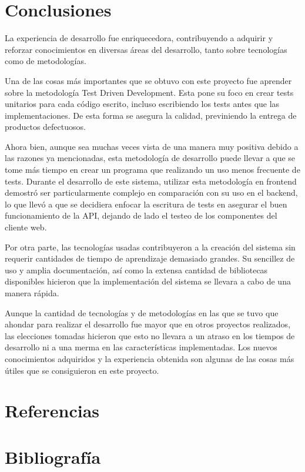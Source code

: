 \documentclass[twoside]{article}
\begin{document}
\section{Conclusiones}
La experiencia de desarrollo fue enriquecedora, contribuyendo a adquirir y reforzar conocimientos en diversas áreas del desarrollo, tanto sobre tecnologías como de metodologías.

Una de las cosas más importantes que se obtuvo con este proyecto fue aprender sobre la metodología Test Driven Development. Esta pone su foco en crear tests unitarios para cada código escrito, incluso escribiendo los tests antes que las implementaciones. De esta forma se asegura la calidad, previniendo la entrega de productos defectuosos.

Ahora bien, aunque sea muchas veces vista de una manera muy positiva debido a las razones ya mencionadas, esta metodología de desarrollo puede llevar a que se tome más tiempo en crear un programa que realizando un uso menos frecuente de tests. Durante el desarrollo de este sistema, utilizar esta metodología en frontend demostró ser particularmente complejo en comparación con su uso en el backend, lo que llevó a que se decidiera enfocar la escritura de tests en asegurar el buen funcionamiento de la API, dejando de lado el testeo de los componentes del cliente web.

Por otra parte, las tecnologías usadas contribuyeron a la creación del sistema sin requerir cantidades de tiempo de aprendizaje demasiado grandes. Su sencillez de uso y amplia documentación, así como la extensa cantidad de bibliotecas disponibles hicieron que la implementación del sistema se llevara a cabo de una manera rápida.

Aunque la cantidad de tecnologías y de metodologías en las que se tuvo que ahondar para realizar el desarrollo fue mayor que en otros proyectos realizados, las elecciones tomadas hicieron que esto no llevara a un atraso en los tiempos de desarrollo ni a una merma en las características implementadas. Los nuevos conocimientos adquiridos y la experiencia obtenida son algunas de las cosas más útiles que se consiguieron en este proyecto.
\newpage
\section{Referencias}
\begin{sloppypar}
\printbibliography[heading=none,category=cited]
\end{sloppypar}
\newpage
\section{Bibliografía}
\printbibliography[heading=none,notcategory=cited]
\newpage
\end{document}
